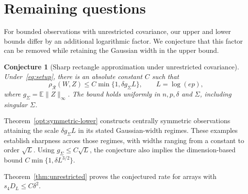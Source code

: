 \documentclass[11pt,letterpaper]{article}
\newtheorem{conjecture}{Conjecture}
\theoremstyle{remark}
\newcommand{\E}{\mathbb E}
\newcommand{\rh}{\rho_{\mathcal R}}
\begin{document}
\section{Remaining questions}\label{sec:discussion}

For bounded observations with unrestricted covariance, our upper and
lower bounds differ by an additional logarithmic factor. We conjecture
that this factor can be removed while retaining the Gaussian width
in the upper bound.
\begin{conjecture}[Sharp rectangle approximation under unrestricted covariance]
\label{conj:sharp-unrestricted}
Under~\eqref{eq:setup}, there is an absolute constant \(C\) such that
\[
 \rh(W,Z)\le C\min\{1,\delta g_\Sigma L\},\qquad L=\log(ep),
\]
where $g_\Sigma=\E\|Z\|_\infty$. The bound holds uniformly in
$n,p,\delta$ and $\Sigma$, including singular $\Sigma$.
\end{conjecture}

Theorem~\ref{opt:symmetric-lower} constructs centrally symmetric
observations attaining the scale $\delta g_\Sigma L$ in its stated
Gaussian-width regimes. These examples establish sharpness across
those regimes, with widths ranging from a constant to order $\sqrt L$.
Using $g_\Sigma\le C\sqrt L$, the conjecture also implies the
dimension-based bound $C\min\{1,\delta L^{3/2}\}$.


Theorem~\ref{thm:unrestricted} proves the conjectured rate for arrays with ${s_4D_L\le C\delta^2}$.
\end{document}
